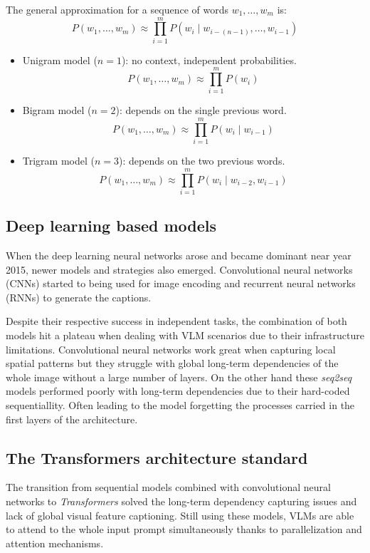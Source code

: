 The general approximation for a sequence of words $w_1, \dots, w_m$ is:
\[
P(w_1, \dots, w_m) \approx \prod_{i=1}^{m} P(w_i \mid w_{i-(n-1)}, \dots, w_{i-1})
\]

\begin{itemize}
	\item Unigram model ($n=1$): no context, independent probabilities.
	\[
	P(w_1, \dots, w_m) \approx \prod_{i=1}^{m} P(w_i)
	\]
	
	\item Bigram model ($n=2$): depends on the single previous word.
	\[
	P(w_1, \dots, w_m) \approx \prod_{i=1}^{m} P(w_i \mid w_{i-1})
	\]
	
	\item Trigram model ($n=3$): depends on the two previous words.
	\[
	P(w_1, \dots, w_m) \approx \prod_{i=1}^{m} P(w_i \mid w_{i-2}, w_{i-1})
	\]
\end{itemize}

\subsection{Deep learning based models}
When the deep learning neural networks arose and became dominant near year 2015, newer models and strategies also emerged. Convolutional neural networks (CNNs) started to being used for image encoding and recurrent neural networks (RNNs) to generate the captions. 

Despite their respective success in independent tasks, the combination of both models hit a plateau when dealing with VLM scenarios due to their infrastructure limitations. Convolutional neural networks work great when capturing local spatial patterns but they struggle with global long-term dependencies of the whole image without a large number of layers. On the other hand these \textit{seq2seq} models performed poorly with long-term dependencies due to their hard-coded sequentiallity. Often leading to the model forgetting the processes carried in the first layers of the architecture. 

\subsection{The Transformers architecture standard}
The transition from sequential models combined with convolutional neural networks to \textit{Transformers} solved the long-term dependency capturing issues and lack of global visual feature captioning. Still using these models, VLMs are able to attend to the whole input prompt simultaneously thanks to parallelization and attention mechanisms.

